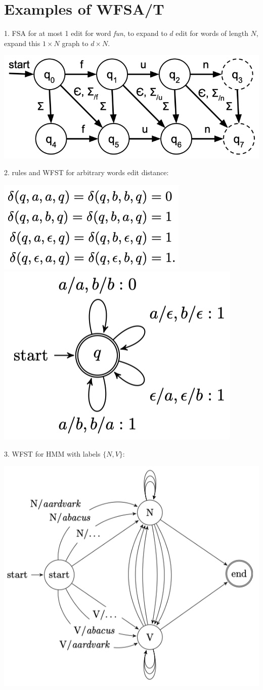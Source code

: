 \section{Examples of WFSA/T}
1. FSA for at most 1 edit for word \textit{fun}, to expand to $d$ edit for words of length $N$, expand this $1\times N$ graph to $d\times N$.
\begin{center}
    \includegraphics[width=0.45\columnwidth]{img/FSA-edit.png}
\end{center}

2.  rules and WFST for arbitrary words edit distance:
\begin{center}
    \includegraphics[width=0.49\columnwidth]{img/WFST-edit-rules.png}
    \includegraphics[width=0.35\columnwidth]{img/WFST-edit.png}
\end{center}

3. WFST for HMM with labels $\{N,V\}$:
\begin{center}
    \includegraphics[width=0.6\columnwidth]{img/WFST-HMM.png}
\end{center}

